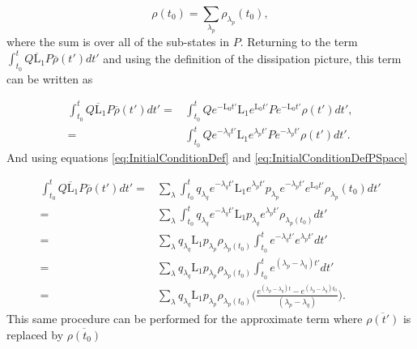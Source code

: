 \documentclass[12pt]{article}
\begin{document}
\begin{equation}\label{eq:InitialConditionDefPSpace}
    \rho(t_0) = \sum_{\lambda_p} \rho_{\lambda_p}(t_0),
\end{equation} where the sum is over all of the sub-states in $P$. Returning to the term $\int_{t_0}^t Q\overline{\mathrm{L}}_1P\overline{\rho}(t') dt'$ and using the definition of the dissipation picture, this term can be written as

\begin{align}
    \int_{t_0}^t Q\overline{\mathrm{L}}_1P\overline{\rho}(t') dt'=&\int_{t_0}^t Qe^{-\mathrm{L}_0 t'}\mathrm{L}_1e^{\mathrm{L}_0 t'}Pe^{-\mathrm{L}_0 t'}\rho(t') dt', \nonumber \\
    =&\int_{t_0}^t Qe^{-\lambda_q t'}\mathrm{L}_1e^{\lambda_p t'}Pe^{-\lambda_p t'}\rho(t') dt'.
\end{align} And using equations \eqref{eq:InitialConditionDef} and \eqref{eq:InitialConditionDefPSpace}

\begin{align}
  \int_{t_0}^t Q\overline{\mathrm{L}}_1P\overline{\rho}(t') dt'=&\sum_{\lambda}\int_{t_0}^t q_{\lambda_q} e^{-\lambda_q t'}\mathrm{L}_1e^{\lambda_p t'}p_{\lambda_p} e^{-\lambda_p t'}e^{\mathrm{L}_0 t'}\rho_{\lambda_p}(t_0)dt' \\
  =& \sum_{\lambda}\int_{t_0}^t q_{\lambda_q} e^{-\lambda_q t'}\mathrm{L}_1p_{\lambda_q} e^{\lambda_p t'}\rho_{\lambda_p(t_0)} \nonumber dt' \\
  =& \sum_{\lambda} q_{\lambda_q} \mathrm{L}_1p_{\lambda_p}\rho_{\lambda_p(t_0)} \int_{t_0}^t e^{-\lambda_q t'} e^{\lambda_p t'} dt' \nonumber \\
  =&\sum_{\lambda} q_{\lambda_q} \mathrm{L}_1p_{\lambda_p}\rho_{\lambda_p(t_0)} \int_{t_0}^t e^{(\lambda_p-\lambda_q) t'}dt' \nonumber \\
  =&\sum_{\lambda} q_{\lambda_q} \mathrm{L}_1p_{\lambda_p}\rho_{\lambda_p(t_0)} \Bigg(\frac{e^{(\lambda_p-\lambda_q) t}-e^{(\lambda_p-\lambda_q) t_0}}{(\lambda_p-\lambda_q)}\Bigg).\nonumber
\end{align} This same procedure can be performed for the approximate term where $\overline{\rho(t')}$ is replaced by $\overline{\rho(t_0)}$
\end{document}
